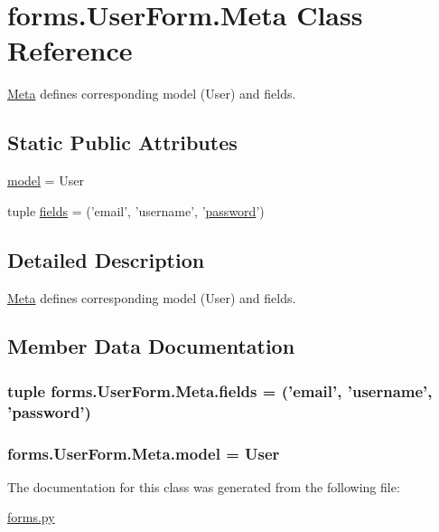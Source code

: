 \hypertarget{classforms_1_1_user_form_1_1_meta}{\section{forms.\-User\-Form.\-Meta Class Reference}
\label{classforms_1_1_user_form_1_1_meta}
}


\hyperlink{classforms_1_1_user_form_1_1_meta}{Meta} defines corresponding model (User) and fields.  


\subsection*{Static Public Attributes}
\begin{DoxyCompactItemize}
\item 
\hyperlink{classforms_1_1_user_form_1_1_meta_a23bd9eb69e69089da04ac7bb727f2419}{model} = User
\item 
tuple \hyperlink{classforms_1_1_user_form_1_1_meta_a3e4e28e78acaca06e2540f7fb1145850}{fields} = ('email', 'username', '\hyperlink{classforms_1_1_user_form_af36c6d916f8374e9c6940810af92d95e}{password}')
\end{DoxyCompactItemize}


\subsection{Detailed Description}
\hyperlink{classforms_1_1_user_form_1_1_meta}{Meta} defines corresponding model (User) and fields. 

\subsection{Member Data Documentation}
\hypertarget{classforms_1_1_user_form_1_1_meta_a3e4e28e78acaca06e2540f7fb1145850}{
\subsubsection[{fields}]{\setlength{\rightskip}{0pt plus 5cm}tuple forms.\-User\-Form.\-Meta.\-fields = ('email', 'username', '{\bf password}')\hspace{0.3cm}{\ttfamily [static]}}}\label{classforms_1_1_user_form_1_1_meta_a3e4e28e78acaca06e2540f7fb1145850}
\hypertarget{classforms_1_1_user_form_1_1_meta_a23bd9eb69e69089da04ac7bb727f2419}{
\subsubsection[{model}]{\setlength{\rightskip}{0pt plus 5cm}forms.\-User\-Form.\-Meta.\-model = User\hspace{0.3cm}{\ttfamily [static]}}}\label{classforms_1_1_user_form_1_1_meta_a23bd9eb69e69089da04ac7bb727f2419}


The documentation for this class was generated from the following file\-:\begin{DoxyCompactItemize}
\item 
\hyperlink{forms_8py}{forms.\-py}\end{DoxyCompactItemize}
